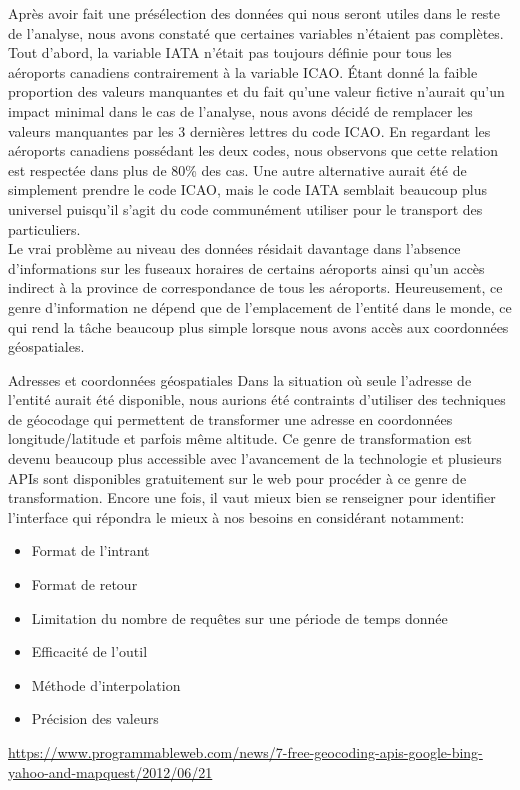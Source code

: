 \noindent
Après avoir fait une présélection des données qui nous seront utiles dans le reste de l'analyse, nous avons constaté que certaines variables n'étaient pas complètes. Tout d'abord, la variable IATA n'était pas toujours définie pour tous les aéroports canadiens contrairement à la variable ICAO. Étant donné la faible proportion des valeurs manquantes et du fait qu'une valeur fictive n'aurait qu'un impact minimal dans le cas de l'analyse, nous avons décidé de remplacer les valeurs manquantes par les 3 dernières lettres du code ICAO. En regardant les aéroports canadiens possédant les deux codes, nous observons que cette relation est respectée dans plus de 80\% des cas. Une autre alternative aurait été de simplement prendre le code ICAO, mais le code IATA semblait beaucoup plus universel puisqu'il s'agit du code communément utiliser pour le transport des particuliers. \\

\noindent
Le vrai problème au niveau des données résidait davantage dans l'absence d'informations sur les fuseaux horaires de certains aéroports ainsi qu'un accès indirect à la province de correspondance de tous les aéroports. Heureusement, ce genre d'information ne dépend que de l'emplacement de l'entité dans le monde, ce qui rend la tâche beaucoup plus simple lorsque nous avons accès aux coordonnées géospatiales. \\

\begin{moreInfo}{Adresses et coordonnées géospatiales}
	Dans la situation où seule l'adresse de l'entité aurait été disponible, nous aurions été contraints d'utiliser des techniques de géocodage qui permettent de transformer une adresse en coordonnées longitude/latitude et parfois même altitude. Ce genre de transformation est devenu beaucoup plus accessible avec l'avancement de la technologie et plusieurs APIs sont disponibles gratuitement sur le web pour procéder à ce genre de transformation. Encore une fois, il vaut mieux bien se renseigner pour identifier l'interface qui répondra le mieux à nos besoins en considérant notamment:
	\begin{itemize}
		\item Format de l'intrant
		\item Format de retour
		\item Limitation du nombre de requêtes sur une période de temps donnée
		\item Efficacité de l'outil
		\item Méthode d'interpolation
		\item Précision des valeurs
	\end{itemize}
	\url{https://www.programmableweb.com/news/7-free-geocoding-apis-google-bing-yahoo-and-mapquest/2012/06/21}
\end{moreInfo}

